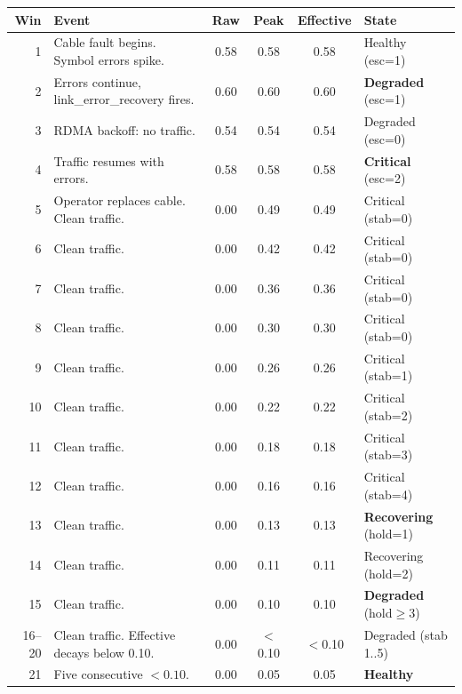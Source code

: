 \documentclass[11pt]{article}
\begin{document}
\begin{center}
\small
\begin{tabular}{r@{\hspace{6pt}}l@{\hspace{6pt}}c@{\hspace{6pt}}c@{\hspace{6pt}}c@{\hspace{6pt}}l}
\toprule
Win & Event & Raw & Peak & Effective & State \\
\midrule
1  & Cable fault begins. Symbol errors spike.      & 0.58 & 0.58 & 0.58 & Healthy (esc=1) \\
2  & Errors continue, link\_error\_recovery fires. & 0.60 & 0.60 & 0.60 & \textbf{Degraded} (esc=1) \\
3  & RDMA backoff: no traffic.                    & 0.54 & 0.54 & 0.54 & Degraded (esc=0) \\
4  & Traffic resumes with errors.                 & 0.58 & 0.58 & 0.58 & \textbf{Critical} (esc=2) \\
5  & Operator replaces cable. Clean traffic.       & 0.00 & 0.49 & 0.49 & Critical (stab=0) \\
6  & Clean traffic.                               & 0.00 & 0.42 & 0.42 & Critical (stab=0) \\
7  & Clean traffic.                               & 0.00 & 0.36 & 0.36 & Critical (stab=0) \\
8  & Clean traffic.                               & 0.00 & 0.30 & 0.30 & Critical (stab=0) \\
9  & Clean traffic.                               & 0.00 & 0.26 & 0.26 & Critical (stab=1) \\
10 & Clean traffic.                               & 0.00 & 0.22 & 0.22 & Critical (stab=2) \\
11 & Clean traffic.                               & 0.00 & 0.18 & 0.18 & Critical (stab=3) \\
12 & Clean traffic.                               & 0.00 & 0.16 & 0.16 & Critical (stab=4) \\
13 & Clean traffic.                               & 0.00 & 0.13 & 0.13 & \textbf{Recovering} (hold=1) \\
14 & Clean traffic.                               & 0.00 & 0.11 & 0.11 & Recovering (hold=2) \\
15 & Clean traffic.                               & 0.00 & 0.10 & 0.10 & \textbf{Degraded} (hold$\geq$3) \\
16--20 & Clean traffic. Effective decays below 0.10. & 0.00 & $<$0.10 & $<$0.10 & Degraded (stab 1..5) \\
21 & Five consecutive $< 0.10$.                   & 0.00 & 0.05 & 0.05 & \textbf{Healthy} \\
\bottomrule
\end{tabular}
\end{center}
\end{document}
